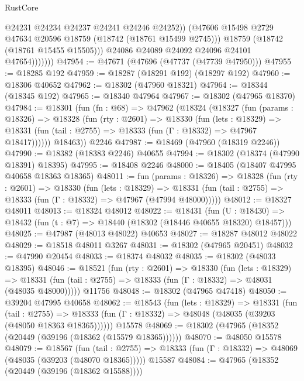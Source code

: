 \begin{lexlean}{RustCore}
\begin{coremodule}
                        @24231
                        @24234
                        @24237
                        @24241
                        @24246
                        @24252))
                    (@47606 @15498 @2729 @47634 @20596 @18759 (@18742 (@18761 @15499 @2745)))
                    @18759
                    (@18742 (@18761 @15455 @15505)))
                  @24086
                  @24089
                  @24092
                  @24096
                  @24101
                  @47654)))))))
@47954 := @47671 (@47696 (@47737 (@47739 @47950)))
@47955 := @18285 @192
@47959 := @18287 (@18291 @192) (@18297 @192)
@47960 := @18306 @40652
@47962 := @18302 (@47960 @18321)
@47964 := @18344 (@18345 @192)
@47965 := @18340 @47964
@47967 := @18302 (@47965 @18370)
@47984 := @18301
    (fun (fn : @68) =>
    @47962
      (@18324
        (@18327
          (fun (params : @18326) =>
          @18328
            (fun (rty : @2601) =>
            @18330
              (fun (lets : @18329) =>
              @18331 (fun (tail : @2755) => @18333 (fun (Γ : @18332) => @47967 @18417))))))
        @18463))
    @2246
@47987 := @18469 (@47960 (@18319 @2246))
@47990 := @18382 (@18383 @2246) @40655
@47994 := @18302 (@18374 (@47990 @18391) @18395)
@47995 := @18408 @2246
@48000 := @18405 (@18407 @47995 @40658 @18363 @18365)
@48011 := fun (params : @18326) =>
  @18328
    (fun (rty : @2601) =>
    @18330
      (fun (lets : @18329) =>
      @18331 (fun (tail : @2755) => @18333 (fun (Γ : @18332) => @47967 (@47994 @48000)))))
@48012 := @18327 @48011
@48013 := @18324 @48012
@48022 := @18431
    (fun (U : @18430) => @18432 (fun (t : @7) => @18440 (@18302 (@18446 @40655 @18320) @18457)))
@48025 := @47987 (@48013 @48022) @40653
@48027 := @18287 @48012 @48022
@48029 := @18518 @48011 @3267
@48031 := @18302 (@47965 @20451)
@48032 := @47990 @20454
@48033 := @18374 @48032
@48035 := @18302 (@48033 @18395)
@48046 := @18521
    (fun (rty : @2601) =>
    @18330
      (fun (lets : @18329) =>
      @18331 (fun (tail : @2755) => @18333 (fun (Γ : @18332) => @48031 (@48035 @48000)))))
    @11756
@48048 := @18302 (@47965 @47418)
@48050 := @39204 @47995 @40658
@48062 := @18543
    (fun (lets : @18329) =>
    @18331
      (fun (tail : @2755) =>
      @18333 (fun (Γ : @18332) => @48048 (@48035 (@39203 (@48050 @18363 @18365))))))
    @15578
@48069 := @18302 (@47965 (@18352 (@20449 (@39196 (@18362 (@15579 @18365))))))
@48070 := @48050 @15578
@48079 := @18567
    (fun (tail : @2755) => @18333 (fun (Γ : @18332) => @48069 (@48035 (@39203 (@48070 @18365)))))
    @15587
@48084 := @47965 (@18352 (@20449 (@39196 (@18362 @15588))))

\end{coremodule}
\end{lexlean}
